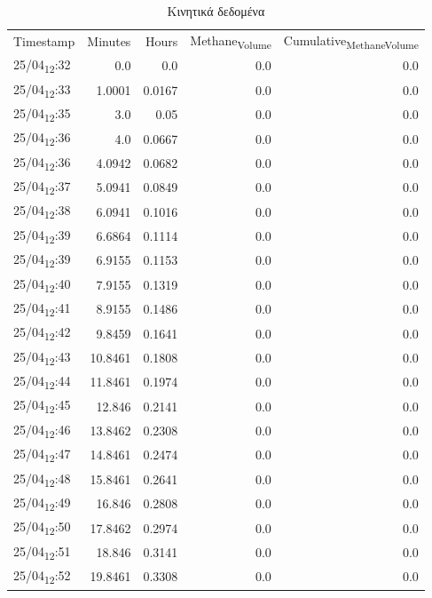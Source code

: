\documentclass[11pt]{article}
\begin{document}
\begin{table}[htbp]
\caption{Κινητικά δεδομένα}
\centering
\begin{tabular}{lrrrr}
Timestamp & Minutes & Hours & Methane\textsubscript{Volume} & Cumulative\textsubscript{Methane}\textsubscript{Volume}\\[0pt]
25/04\textsubscript{12}:32 & 0.0 & 0.0 & 0.0 & 0.0\\[0pt]
25/04\textsubscript{12}:33 & 1.0001 & 0.0167 & 0.0 & 0.0\\[0pt]
25/04\textsubscript{12}:35 & 3.0 & 0.05 & 0.0 & 0.0\\[0pt]
25/04\textsubscript{12}:36 & 4.0 & 0.0667 & 0.0 & 0.0\\[0pt]
25/04\textsubscript{12}:36 & 4.0942 & 0.0682 & 0.0 & 0.0\\[0pt]
25/04\textsubscript{12}:37 & 5.0941 & 0.0849 & 0.0 & 0.0\\[0pt]
25/04\textsubscript{12}:38 & 6.0941 & 0.1016 & 0.0 & 0.0\\[0pt]
25/04\textsubscript{12}:39 & 6.6864 & 0.1114 & 0.0 & 0.0\\[0pt]
25/04\textsubscript{12}:39 & 6.9155 & 0.1153 & 0.0 & 0.0\\[0pt]
25/04\textsubscript{12}:40 & 7.9155 & 0.1319 & 0.0 & 0.0\\[0pt]
25/04\textsubscript{12}:41 & 8.9155 & 0.1486 & 0.0 & 0.0\\[0pt]
25/04\textsubscript{12}:42 & 9.8459 & 0.1641 & 0.0 & 0.0\\[0pt]
25/04\textsubscript{12}:43 & 10.8461 & 0.1808 & 0.0 & 0.0\\[0pt]
25/04\textsubscript{12}:44 & 11.8461 & 0.1974 & 0.0 & 0.0\\[0pt]
25/04\textsubscript{12}:45 & 12.846 & 0.2141 & 0.0 & 0.0\\[0pt]
25/04\textsubscript{12}:46 & 13.8462 & 0.2308 & 0.0 & 0.0\\[0pt]
25/04\textsubscript{12}:47 & 14.8461 & 0.2474 & 0.0 & 0.0\\[0pt]
25/04\textsubscript{12}:48 & 15.8461 & 0.2641 & 0.0 & 0.0\\[0pt]
25/04\textsubscript{12}:49 & 16.846 & 0.2808 & 0.0 & 0.0\\[0pt]
25/04\textsubscript{12}:50 & 17.8462 & 0.2974 & 0.0 & 0.0\\[0pt]
25/04\textsubscript{12}:51 & 18.846 & 0.3141 & 0.0 & 0.0\\[0pt]
25/04\textsubscript{12}:52 & 19.8461 & 0.3308 & 0.0 & 0.0\\[0pt]

\end{tabular}
\end{table}
\end{document}
